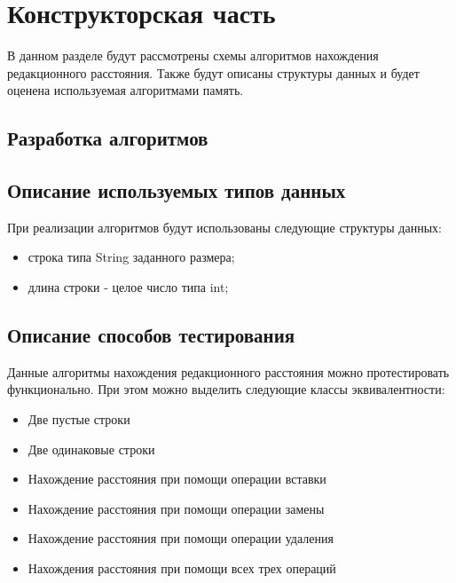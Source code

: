 \chapter{Конструкторская часть}
В данном разделе будут рассмотрены схемы алгоритмов нахождения редакционного расстояния. Также будут описаны структуры данных и будет оценена используемая алгоритмами память.

\section{Разработка алгоритмов}
  
   


\clearpage
{}
\clearpage
{}
\clearpage


\section{Описание используемых типов данных}

При реализации алгоритмов будут использованы следующие структуры данных:
\begin{itemize}
	\item строка типа String заданного размера;
	\item длина строки - целое число типа int;
\end{itemize}


\section{Описание способов тестирования}
Данные алгоритмы нахождения редакционного расстояния можно протестировать функционально. При этом можно выделить следующие классы эквивалентности:

\begin{itemize}
    \item Две пустые строки
    \item Две одинаковые строки
    \item Нахождение расстояния при помощи операции вставки
    \item Нахождение расстояния при помощи операции замены
    \item Нахождение расстояния при помощи операции удаления
    \item Нахождения расстояния при помощи всех трех операций
\end{itemize}





